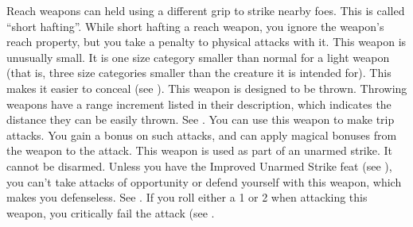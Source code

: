 Reach weapons can held using a different grip to strike nearby foes. This is called ``short hafting''. While short hafting a reach weapon, you ignore the weapon's reach property, but you take a  penalty to physical attacks with it.
 This weapon is unusually small. It is one size category smaller than normal for a light weapon (that is, three size categories smaller than the creature it is intended for). This makes it easier to conceal (see ).
 This weapon is designed to be thrown. Throwing weapons have a range increment listed in their description, which indicates the distance they can be easily thrown. See .
 You can use this weapon to make trip attacks. You gain a  bonus on such attacks, and can apply magical bonuses from the weapon to the attack.
 This weapon is used as part of an unarmed strike. It cannot be disarmed. Unless you have the Improved Unarmed Strike feat (see ), you can't take attacks of opportunity or defend yourself with this weapon, which makes you defenseless. See .
 If you roll either a 1 or 2 when attacking this weapon, you critically fail the attack (see .

